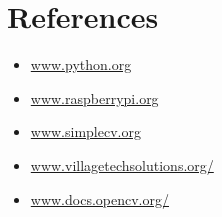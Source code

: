 \documentclass[12pt, a4paper]{article}
\begin{document}
\newpage
\section{References}
\begin{itemize}
	\item \url{www.python.org}
	\item \url{www.raspberrypi.org}
	\item \url{www.simplecv.org}
	\item \url{www.villagetechsolutions.org/}
	\item \url{www.docs.opencv.org/}
\end{itemize}
\end{document}
